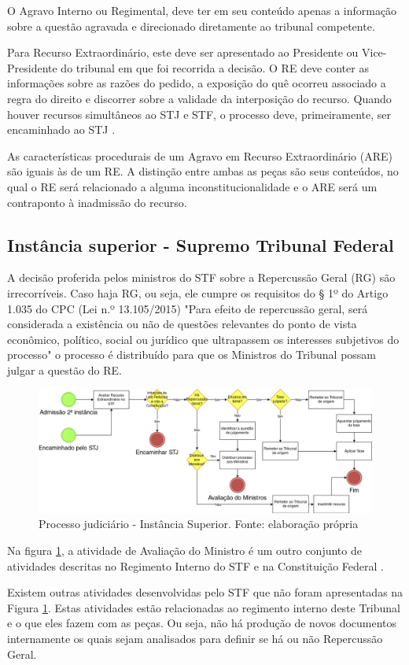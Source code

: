 O Agravo Interno ou Regimental, deve ter em seu conteúdo apenas a informação sobre a questão agravada e direcionado diretamente ao tribunal competente.

Para Recurso Extraordinário, este deve ser apresentado ao Presidente ou Vice-Presidente do tribunal em que foi recorrida a decisão. O RE deve conter as informações sobre as razões do pedido, a exposição do quê ocorreu associado a regra do direito e discorrer sobre a validade da interposição do recurso. Quando houver recursos simultâneos ao STJ e STF, o processo deve, primeiramente, ser encaminhado ao STJ \cite{BRASIL2015}.

As características procedurais de um Agravo em Recurso Extraordinário (ARE) são iguais às de um RE. A distinção entre ambas as peças são seus conteúdos, no qual o RE será relacionado a alguma inconstitucionalidade e o ARE será um contraponto à inadmissão do recurso.

\subsection{Instância superior - Supremo Tribunal Federal}

A decisão proferida pelos ministros do STF sobre a Repercussão Geral (RG) são irrecorríveis. Caso haja RG, ou seja, ele cumpre os requisitos do § 1º do Artigo 1.035 do CPC (Lei n.º 13.105/2015)
"Para efeito de repercussão geral, será considerada a existência ou não de questões relevantes do ponto de vista econômico, político, social ou jurídico que ultrapassem os interesses subjetivos do processo" \cite{BRASIL2015} o processo é distribuído para que os Ministros do Tribunal possam julgar a questão do RE. 

\begin{figure}[h]
	\centering
    \includegraphics[keepaspectratio=true,scale=0.4]{figuras/processoSuperior}
	\caption[Processo judiciário - Instância Superior]{Processo judiciário - Instância Superior. Fonte: elaboração própria}
	\label{fig:processoSuperior}
\end{figure}

Na figura \ref{fig:processoSuperior}, a atividade de Avaliação do Ministro é um outro conjunto de atividades descritas no Regimento Interno do STF \cite{STF2016} e na Constituição Federal \cite{BRASIL1988}. 

Existem outras atividades desenvolvidas pelo STF que não foram apresentadas na Figura \ref{fig:processoSuperior}. Estas atividades estão relacionadas ao regimento interno \cite{STF2016} deste Tribunal e o que eles fazem com as peças. Ou seja, não há produção de novos documentos internamente os quais sejam analisados para definir se há ou não Repercussão Geral.